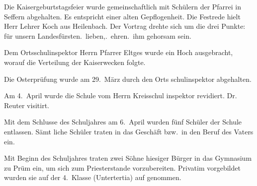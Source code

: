 

\pstart
Die Kaisergeburtstagsfeier wurde gemeinschaftlich mit\ob
Schülern der Pfarrei in Seffern abgehalten. Es entspricht\ob
einer alten Gepflogenheit. Die Festrede hielt\ob
Herr Lehrer Koch aus Heilenbach. Der\ob
Vortrag drehte sich um die drei Punkte: für\ob
unsern Landesfürsten.\ lieben,.\ ehren.\ ihm gehorsam sein.

Dem Ortsschulinspektor Herrn Pfarrer Eltges wurde\ob
ein Hoch ausgebracht, worauf die Verteilung der Kaiserwecken\ob
folgte.

\pend
{}
\pstart

Die Osterprüfung wurde am 29.\ März durch den Orts\ohb
schulinspektor abgehalten.

Am 4.\ April wurde die Schule vom Herrn Kreisschul\ohb
inspektor revidiert. Dr. Reuter visitirt.

Mit dem Schlusse des Schuljahres am 6.\ April\ob
wurden fünf Schüler der Schule entlassen. Sämt\ohb
liche Schüler traten in das Geschäft bzw.\ in den\ob
Beruf des Vaters ein.

Mit Beginn des Schuljahres traten zwei Söhne hiesiger\ob
Bürger in das Gymnasium zu Prüm ein, um sich\ob
zum Priesterstande vorzubereiten. Privatim vorgebildet\ob
wurden sie auf der 4.\ Klasse (Untertertia) auf\ohb
genommen.
\pend
